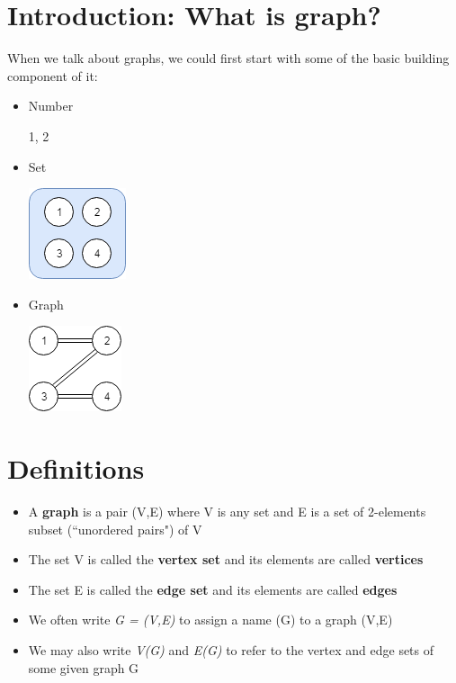 \documentclass{article}
\begin{document}
\section{Introduction: What is graph?}
When we talk about graphs, we could first start with some of the basic building component of it:
\begin{itemize}
    \item Number
     \begin{center}
        1, 2
     \end{center}
    \item Set
     \begin{center}
      \includegraphics{images/set.png}
     \end{center}
    \item Graph
     \begin{center}
      \includegraphics{images/graph.png}
     \end{center}
\end{itemize}

\section{Definitions}
\begin{itemize}
    \item A \textbf{graph} is a pair (V,E) where V is any set and E is a set of 2-elements subset (``unordered pairs") of V
    \item The set V is called the \textbf{vertex set} and its elements are called \textbf{vertices}
    \item The set E is called the \textbf{edge set} and its elements are called \textbf{edges}
    \item We often write \textit{G = (V,E)} to assign a name (G) to a graph (V,E)
    \item We may also write \textit{V(G)} and \textit{E(G)} to refer to the vertex and edge sets of some given graph G
\end{itemize}
\end{document}
